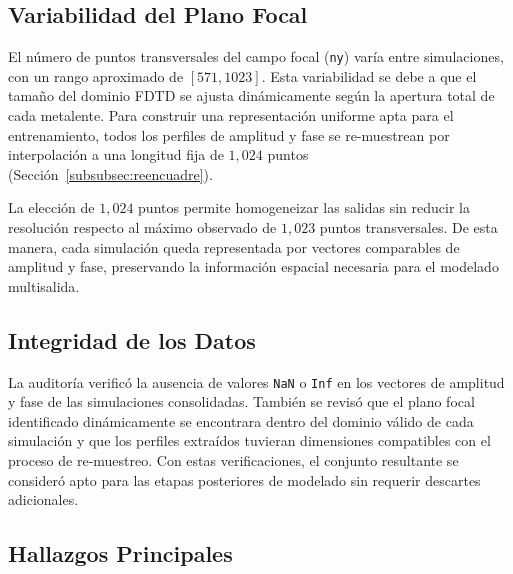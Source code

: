 \subsection{Variabilidad del Plano Focal}\label{subsec:variabilidad}

El número de puntos transversales del campo focal (\texttt{ny}) varía entre simulaciones, con un rango aproximado de $[571,1023]$. Esta variabilidad se debe a que el tamaño del dominio FDTD se ajusta dinámicamente según la apertura total de cada metalente. Para construir una representación uniforme apta para el entrenamiento, todos los perfiles de amplitud y fase se re-muestrean por interpolación a una longitud fija de $1{,}024$ puntos (Sección~\ref{subsubsec:reencuadre}).

La elección de $1{,}024$ puntos permite homogeneizar las salidas sin reducir la resolución respecto al máximo observado de $1{,}023$ puntos transversales. De esta manera, cada simulación queda representada por vectores comparables de amplitud y fase, preservando la información espacial necesaria para el modelado multisalida.

\subsection{Integridad de los Datos}\label{subsec:anomalias}

La auditoría verificó la ausencia de valores \texttt{NaN} o \texttt{Inf} en los vectores de amplitud y fase de las simulaciones consolidadas. También se revisó que el plano focal identificado dinámicamente se encontrara dentro del dominio válido de cada simulación y que los perfiles extraídos tuvieran dimensiones compatibles con el proceso de re-muestreo. Con estas verificaciones, el conjunto resultante se consideró apto para las etapas posteriores de modelado sin requerir descartes adicionales.

\subsection{Hallazgos Principales}\label{subsec:hallazgos_eda}

